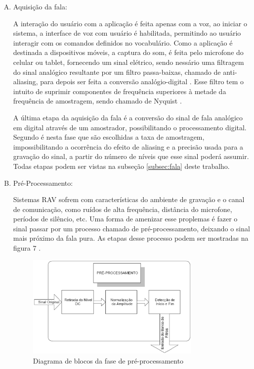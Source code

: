 \begin{enumerate}[A)]
\item {Aquisição da fala:}

A interação do usuário com a aplicação é feita apenas com a voz, ao iniciar o sistema, a interface de voz com usuário é habilitada, permitindo ao usuário interagir com os comandos definidos no vocabulário. Como a aplicação é destinada a dispositivos móveis, a captura do som, é feita pelo microfone do celular ou tablet, fornecendo um sinal elétrico, sendo nessário uma filtragem do sinal analógico resultante por um filtro passa-baixas, chamado de anti-aliasing, para depois ser feita a conversão analógio-digital \cite{DigitalProcRabiner}. Esse filtro tem o intuito de suprimir componentes de frequência superiores à metade da frequência de amostragem, sendo chamado de Nyquist \cite{DigitalSigProakis}.

A última etapa da aquisição da fala é a conversão do sinal de fala analógico em digital através de um
amostrador, possibilitando o processamento digital. Segundo  é nesta fase que são
escolhidas a taxa de amostragem, impossibilitando a ocorrência do efeito de aliasing e a precisão usada para a gravação do sinal, a partir do número de níveis que esse sinal poderá assumir. 
Todas etapas podem ser vistas na subseção \ref{subsec:fala} deste trabalho.

\item {Pré-Processamento:}

Sistemas RAV sofrem com características do ambiente de gravação e o canal de comunicação, como ruídos de alta frequência, distância do microfone, períodos de silêncio, etc. Uma forma de amenizar esse proplemas é fazer o sinal passar por um processo chamado de pré-processamento, deixando o sinal mais próximo da fala pura. As etapas desse processo podem ser mostradas na figura 7 \cite{RavIsolAnderson}. 

\begin{figure}[H]
\includegraphics[width=0.8\textwidth]{graficos/pre_proc.eps}
\caption{Diagrama de blocos da fase de pré-processamento}
\end{figure}


\end{enumerate}
